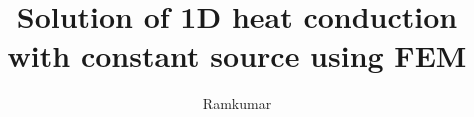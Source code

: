 \documentclass{beamer}
\title{Solution of 1D heat conduction with constant source using FEM}
\author{Ramkumar}
\begin{document}
\frame{\maketitle}


\end{document}
